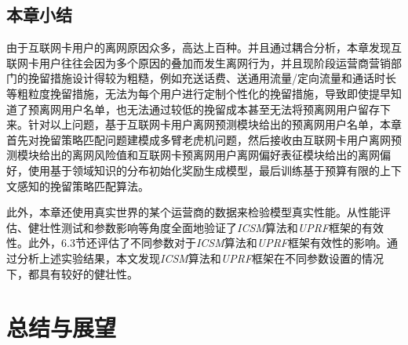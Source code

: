 \subsection{本章小结}
由于互联网卡用户的离网原因众多，高达上百种。并且通过耦合分析，本章发现互联网卡用户往往会因为多个原因的叠加而发生离网行为，并且现阶段运营商营销部门的挽留措施设计得较为粗糙，例如充送话费、送通用流量/定向流量和通话时长等粗粒度挽留措施，无法为每个用户进行定制个性化的挽留措施，导致即使提早知道了预离网用户名单，也无法通过较低的挽留成本甚至无法将预离网用户留存下来。针对以上问题，基于互联网卡用户离网预测模块给出的预离网用户名单，本章首先对挽留策略匹配问题建模成多臂老虎机问题，然后接收由互联网卡用户离网预测模块给出的离网风险值和互联网卡预离网用户离网偏好表征模块给出的离网偏好，使用基于领域知识的分布初始化奖励生成模型，最后训练基于预算有限的上下文感知的挽留策略匹配算法。\par
此外，本章还使用真实世界的某个运营商的数据来检验模型真实性能。从性能评估、健壮性测试和参数影响等角度全面地验证了\emph{ICSM}算法和\emph{UPRF}框架的有效性。此外，6.3节还评估了不同参数对于\emph{ICSM}算法和\emph{UPRF}框架有效性的影响。通过分析上述实验结果，本文发现\emph{ICSM}算法和\emph{UPRF}框架在不同参数设置的情况下，都具有较好的健壮性。

\newpage

\section{总结与展望}
